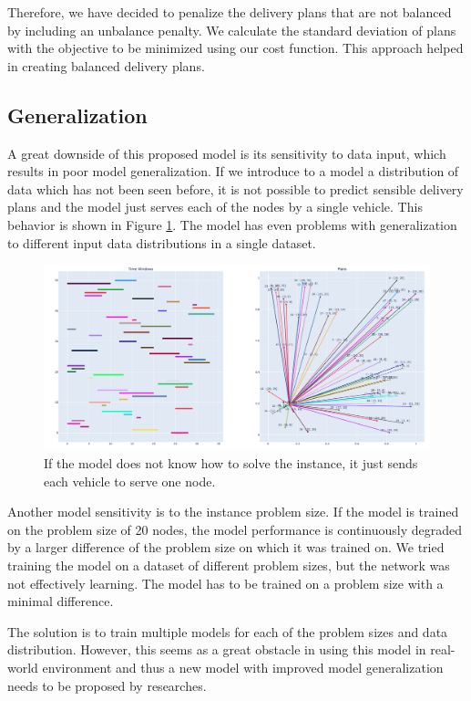 Therefore, we have decided to penalize the delivery plans that are not balanced by including an unbalance penalty. We calculate the standard deviation of plans with the objective to be minimized using our cost function. This approach helped in creating balanced delivery plans.

\subsection{Generalization}
A great downside of this proposed model is its sensitivity to data input, which results in poor model generalization. If we introduce to a model a distribution of data which has not been seen before, it is not possible to predict sensible delivery plans and the model just serves each of the nodes by a single vehicle. This behavior is shown in Figure \ref{fig:model-breaks}. The model has even problems with generalization to different input data distributions in a single dataset.

\begin{figure}[ht]
    \centering
    \includegraphics[width=1.0\textwidth]{resources/evaluation/data-sensitivity.png}
    \caption{If the model does not know how to solve the instance, it just sends each vehicle to serve one node.}
    \label{fig:model-breaks}
\end{figure}

Another model sensitivity is to the instance problem size. If the model is trained on the problem size of 20 nodes, the model performance is continuously degraded by a larger difference of the problem size on which it was trained on. We tried training the model on a dataset of different problem sizes, but the network was not effectively learning. The model has to be trained on a problem size with a minimal difference.

The solution is to train multiple models for each of the problem sizes and data distribution. However, this seems as a great obstacle in using this model in real-world environment and thus a new model with improved model generalization needs to be proposed by researches.

